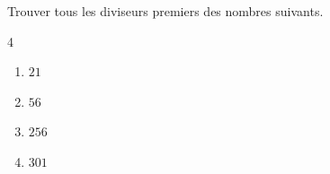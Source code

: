 \begin{exo}{}
	Trouver tous les diviseurs premiers des nombres suivants.
	\vspace*{-2mm}\begin{multicols}{4}
		\begin{enumerate}
			\item $21$
			\item $56$
			\item $256$
			\item $301$
		\end{enumerate}
	\end{multicols}
\end{exo}
